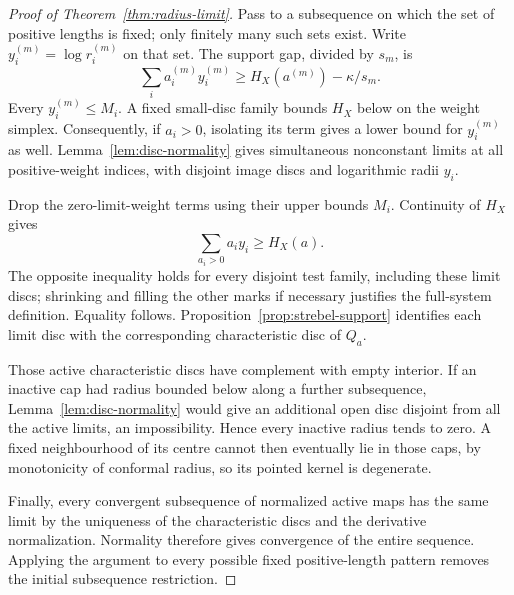 \documentclass[11pt,a4paper]{article}
\theoremstyle{definition}
\begin{document}
\begin{proof}[Proof of Theorem~\ref{thm:radius-limit}]
Pass to a subsequence on which the set of positive lengths is fixed; only finitely many such sets exist. Write $y_i^{(m)}=\log r_i^{(m)}$ on that set. The support gap, divided by $s_m$, is
\[
 \sum_i a_i^{(m)}y_i^{(m)}\ge H_X(a^{(m)})-\kappa/s_m.
\]
Every $y_i^{(m)}\le M_i$. A fixed small-disc family bounds $H_X$ below on the weight simplex. Consequently, if $a_i>0$, isolating its term gives a lower bound for $y_i^{(m)}$ as well. Lemma~\ref{lem:disc-normality} gives simultaneous nonconstant limits at all positive-weight indices, with disjoint image discs and logarithmic radii $y_i$.

Drop the zero-limit-weight terms using their upper bounds $M_i$. Continuity of $H_X$ gives
\[
                 \sum_{a_i>0}a_i y_i\ge H_X(a).
\]
The opposite inequality holds for every disjoint test family, including these limit discs; shrinking and filling the other marks if necessary justifies the full-system definition. Equality follows. Proposition~\ref{prop:strebel-support} identifies each limit disc with the corresponding characteristic disc of $Q_a$.

Those active characteristic discs have complement with empty interior. If an inactive cap had radius bounded below along a further subsequence, Lemma~\ref{lem:disc-normality} would give an additional open disc disjoint from all the active limits, an impossibility. Hence every inactive radius tends to zero. A fixed neighbourhood of its centre cannot then eventually lie in those caps, by monotonicity of conformal radius, so its pointed kernel is degenerate.

Finally, every convergent subsequence of normalized active maps has the same limit by the uniqueness of the characteristic discs and the derivative normalization. Normality therefore gives convergence of the entire sequence. Applying the argument to every possible fixed positive-length pattern removes the initial subsequence restriction.
\end{proof}
\end{document}
